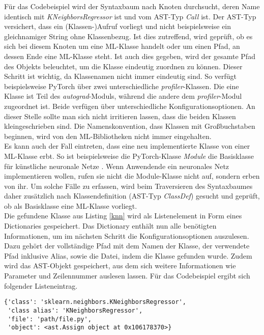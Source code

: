 \documentclass[german,bachelor]{swsLeipzig}
\begin{document}
\noindent Für das Codebeispiel wird der Syntaxbaum nach Knoten durchsucht, deren Name identisch mit \textit{KNeighborsRegressor} ist und
vom AST-Typ \textit{Call} ist.
Der AST-Typ versichert, dass ein (Klassen-)Aufruf vorliegt und nicht beispielsweise ein gleichnamiger String ohne Klassenbezug.
Ist dies zutreffend, wird geprüft, ob es sich bei diesem Knoten um eine ML-Klasse handelt oder um einen Pfad, an dessen Ende eine ML-Klasse steht.
Ist auch dies gegeben, wird der gesamte Pfad des Objekts beleuchtet, um die Klasse eindeutig zuordnen zu können.
Dieser Schritt ist wichtig, da Klassenamen nicht immer eindeutig sind.
So verfügt beispielsweise PyTorch über zwei unterschiedliche \textit{profiler}-Klassen.
Die eine Klasse ist Teil des \textit{autograd}-Moduls, während die andere dem \textit{profiler}-Modul zugeordnet ist.
Beide verfügen über unterschiedliche Konfigurationsoptionen.
An dieser Stelle sollte man sich nicht irritieren lassen, dass die beiden Klassen kleingeschrieben sind.
Die Namenskonvention, dass Klassen mit Großbuchstaben beginnen, wird von den ML-Bibliotheken nicht immer eingehalten.\\
\indent Es kann auch der Fall eintreten, dass eine neu implementierte Klasse von einer ML-Klasse erbt.
So ist beispielsweise die PyTorch-Klasse \textit{Module} die Basisklasse für künstliche neuronale Netze \cite[]{NEURIPS2019_9015}.
Wenn Anwendende ein neuronales Netz implementieren wollen, rufen sie nicht die Module-Klasse nicht auf, sondern erben von ihr.
Um solche Fälle zu erfassen, wird beim Traversieren des Syntaxbaumes daher zusätzlich nach Klassendefinition (AST-Typ \textit{ClassDef}) gesucht und geprüft,
ob als Basisklasse eine ML-Klasse vorliegt. \\
\indent Die gefundene Klasse aus Listing \ref{knn} wird als Listenelement in Form eines Dictionaries gespeichert.
Das Dictionary enthält nun alle benötigten Informationen, um im nächsten Schritt
die Konfigurationsoptionen auszulesen.
Dazu gehört der vollständige Pfad mit dem Namen der Klasse, der verwendete Pfad inklusive Alias, sowie die Datei, indem
die Klasse gefunden wurde.
Zudem wird das AST-Objekt gespeichert, aus dem sich weitere Informationen wie Parameter und Zeilennummer auslesen lassen.
Für das Codebeispiel ergibt sich folgender Listeneintrag.\\

\noindent\begin{minipage}{\linewidth}
\begin{lstlisting}[frame=single, label=class_dict, basicstyle=\small, caption={Dictionary-Eintrag der KNeighborsRegressor-Klasse},captionpos=b]
{'class': 'sklearn.neighbors.KNeighborsRegressor',
 'class alias': 'KNeighborsRegressor',
 'file': 'path/file.py',
 'object': <ast.Assign object at 0x106178370>}
\end{lstlisting}
\end{minipage}
\
\end{document}
